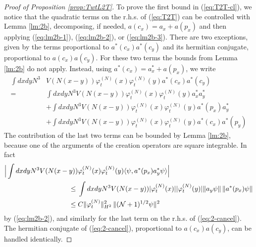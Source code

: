 \documentclass[11pt,a4paper,DIV11]{scrartcl}	%
\newcommand{\cN}{{\cal N}}
\begin{document}
\begin{proof}[Proof of Proposition \ref{prop:TwtL2T}]
To prove the first bound in (\ref{eq:T2T-cl}), we notice that the quadratic terms on the r.h.s. of (\ref{eq:T2T}) can be controlled with Lemma \ref{lm:2b}, decomposing, if needed, $a (c_x) = a_x + a(p_x)$ and then applying (\ref{eq:lm2b-1}), (\ref{eq:lm2b-2}), or (\ref{eq:lm2b-3}). There are two exceptions, given by the terms proportional to $a^* (c_x) a^* (c_y)$ and its hermitian conjugate, proportional to $a (c_x) a(c_y)$. For these two terms the bounds from Lemma \ref{lm:2b} do not apply. Instead, using $a^* (c_x) = a^*_x + a (p_x)$, we write 
\begin{equation}\label{eq:2-cancel} \begin{split} 
\int dx dy N^3 & V(N (x-y)) \varphi_t^{(N)} (x) \varphi_t^{(N)} (y) a^* (c_x) a^* (c_y) \\ = \; &   
\int dx dy N^3 V(N (x-y)) \varphi_t^{(N)} (x) \varphi_t^{(N)} (y) a_x^* a_y^* \\ &+ 
\int dx dy N^3 V(N (x-y)) \varphi_t^{(N)} (x) \varphi_t^{(N)} (y) a^* (p_x) a_y^* \\ &+ 
\int dx dy N^3 V(N (x-y)) \varphi_t^{(N)} (x) \varphi_t^{(N)} (y) a^* (c_x) a^* (p_y) 
 \end{split} \end{equation}
The contribution of the last two terms can be bounded by Lemma \ref{lm:2b}, because one of the arguments of the creation operators are square integrable. In fact
\[ \begin{split} \Big| \int dx dy N^3 V(N (x-y)) &\varphi_t^{(N)} (x) \varphi_t^{(N)} (y)  \langle \psi , a^* (p_x) a_y^* \psi \rangle \Big| \\ \leq \; & \int dx dy N^3 V(N (x-y)) |\varphi_t^{(N)} (x)| |\varphi_t^{(N)} (y)|   \| a_y \psi \| \, \| a^* (p_x) \psi \|   \\ \leq \; & C \| \varphi_t^{(N)} \|_{H^2}^2 \, \| (\cN+1)^{1/2} \psi \|^2 
\end{split} \]
by (\ref{eq:lm2b-2}), and similarly for the last term on the r.h.s. of (\ref{eq:2-cancel}).
The hermitian conjugate of (\ref{eq:2-cancel}), proportional to $a (c_x) a (c_y)$, can be handled identically. 


\end{proof}
\end{document}
